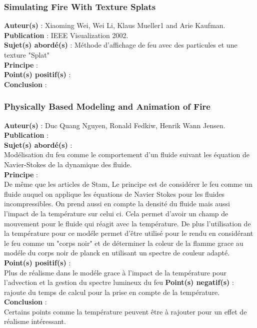 \documentclass[a4paper,10pt]{article}
\begin{document}
\subsubsection{Simulating Fire With Texture Splats}
\textbf{Auteur(s)} : Xiaoming Wei, Wei Li, Klaus Mueller1 and Arie Kaufman.\\
\textbf{Publication} : IEEE Visualization 2002. \\
\textbf{Sujet(s) abordé(s)} : Méthode d'affichage de feu avec des particules et une texture "Splat"\\ 
\textbf{Principe} :\\	
\textbf{Point(s) positif(s)} :\\
\textbf{Conclusion} :\\


\subsubsection{Physically Based Modeling and Animation of Fire}
\textbf{Auteur(s)} : Duc Quang Nguyen, Ronald Fedkiw, Henrik Wann Jensen.\\
\textbf{Publication} :  \\
\textbf{Sujet(s) abordé(s)} : \\ 
	Modélisation du feu comme le comportement d'un fluide suivant les équation de Navier-Stokes de la dynamique des fluide.\\
\textbf{Principe} :\\	
	De même que les articles de Stam, Le principe est de considérer le feu comme un fluide auquel on applique les équations de Navier Stokes  pour les fluides incompressibles. On prend aussi en compte la densité du fluide mais aussi l'impact de la température sur celui ci. Cela permet d'avoir un champ de mouvement pour le fluide qui réagit avec la température. De plus l'utilisation de la température pour ce modéle permet d'être utilisé pour le rendu en considérant le feu comme un "corps noir" et de déterminer la coleur de la flamme grace au modéle du corps noir de planck en utilisant un spectre de couleur adapté.
\textbf{Point(s) positif(s)} :\\
	Plus de réalisme dans le modéle grace à l'impact de la température pour l'advection et la gestion du spectre lumineux du feu	
\textbf{Point(s) negatif(s)} :\\
	rajoute du temps de calcul pour la prise en compte de la température.
\textbf{Conclusion} :\\
	Certains points comme la température peuvent être à rajouter pour un effet de réalisme intéressant.\\
\end{document}
